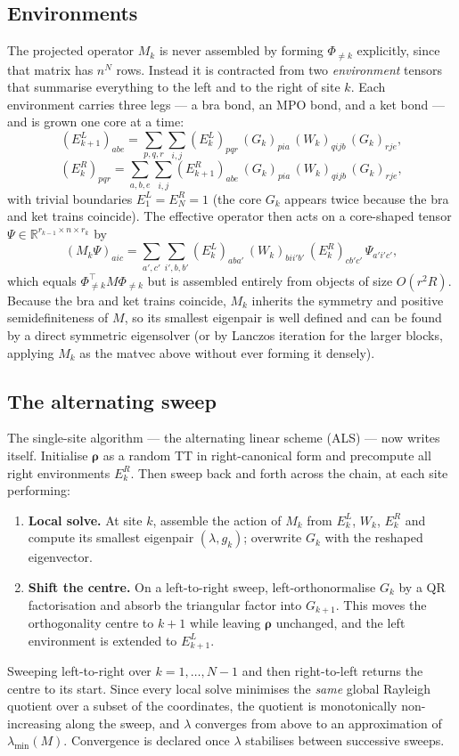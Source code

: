 \documentclass[12pt]{article}
\newcommand{\R}{\mathbb{R}}
\newcommand{\brho}{\boldsymbol{\rho}}
\theoremstyle{definition}
\theoremstyle{remark}
\begin{document}
\subsection{Environments}\label{sec:environments}

The projected operator $M_k$ is never assembled by forming $\Phi_{\neq k}$ explicitly, since that matrix has $n^N$ rows. Instead it is contracted from two \emph{environment} tensors that summarise everything to the left and to the right of site $k$. Each environment carries three legs --- a bra bond, an MPO bond, and a ket bond --- and is grown one core at a time:
\[
(E^L_{k+1})_{abe}
= \sum_{p,q,r} \sum_{i,j}
  (E^L_k)_{pqr}\, (G_k)_{pia}\, (W_k)_{qijb}\, (G_k)_{rje},
\]
\[
(E^R_{k})_{pqr}
= \sum_{a,b,e} \sum_{i,j}
  (E^R_{k+1})_{abe}\, (G_k)_{pia}\, (W_k)_{qijb}\, (G_k)_{rje},
\]
with trivial boundaries $E^L_1 = E^R_N = 1$ (the core $G_k$ appears twice because the bra and ket trains coincide). The effective operator then acts on a core-shaped tensor $\Psi \in \R^{r_{k-1} \times n \times r_k}$ by
\[
(M_k \Psi)_{aic}
= \sum_{a',c'} \sum_{i',b,b'}
  (E^L_k)_{aba'}\, (W_k)_{bii'b'}\, (E^R_k)_{cb'c'}\, \Psi_{a'i'c'},
\]
which equals $\Phi_{\neq k}^\top M \Phi_{\neq k}$ but is assembled entirely from objects of size $O(r^2 R)$. Because the bra and ket trains coincide, $M_k$ inherits the symmetry and positive semidefiniteness of $M$, so its smallest eigenpair is well defined and can be found by a direct symmetric eigensolver (or by Lanczos iteration for the larger blocks, applying $M_k$ as the matvec above without ever forming it densely).

\subsection{The alternating sweep}\label{sec:sweep}

The single-site algorithm --- the alternating linear scheme (ALS) --- now writes itself. Initialise $\brho$ as a random TT in right-canonical form and precompute all right environments $E^R_k$. Then sweep back and forth across the chain, at each site performing:
\begin{enumerate}
    \item \textbf{Local solve.} At site $k$, assemble the action of $M_k$ from $E^L_k$, $W_k$, $E^R_k$ and compute its smallest eigenpair $(\lambda, g_k)$; overwrite $G_k$ with the reshaped eigenvector.
    \item \textbf{Shift the centre.} On a left-to-right sweep, left-orthonormalise $G_k$ by a QR factorisation and absorb the triangular factor into $G_{k+1}$. This moves the orthogonality centre to $k+1$ while leaving $\brho$ unchanged, and the left environment is extended to $E^L_{k+1}$.
\end{enumerate}
Sweeping left-to-right over $k = 1, \dots, N-1$ and then right-to-left returns the centre to its start. Since every local solve minimises the \emph{same} global Rayleigh quotient over a subset of the coordinates, the quotient is monotonically non-increasing along the sweep, and $\lambda$ converges from above to an approximation of $\lambda_{\min}(M)$. Convergence is declared once $\lambda$ stabilises between successive sweeps.
\end{document}
